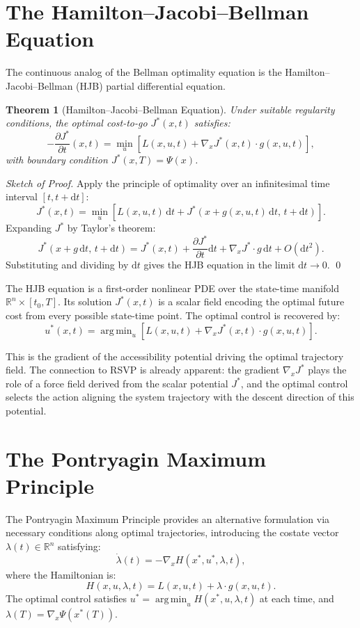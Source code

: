 \documentclass[12pt, a4paper, openany]{book}
\theoremstyle{plain}
\newtheorem{theorem}{Theorem}[chapter]
\theoremstyle{definition}
\theoremstyle{remark}
\newcommand{\argmin}{\operatorname{arg\,min}}
\begin{document}
\section{The Hamilton--Jacobi--Bellman Equation}

The continuous analog of the Bellman optimality equation is the Hamilton--Jacobi--Bellman (HJB) partial differential equation.

\begin{theorem}[Hamilton--Jacobi--Bellman Equation]
Under suitable regularity conditions, the optimal cost-to-go $J^*(x,t)$ satisfies:
\[
-\frac{\partial J^*}{\partial t}(x,t) = \min_u\left[L(x,u,t) + \nabla_x J^*(x,t) \cdot g(x,u,t)\right],
\]
with boundary condition $J^*(x,T) = \Psi(x)$.
\end{theorem}

\begin{proof}[Sketch of Proof]
Apply the principle of optimality over an infinitesimal time interval $[t, t+\mathrm{d}t]$:
\[
J^*(x,t) = \min_u\left[L(x,u,t)\,\mathrm{d}t + J^*(x + g(x,u,t)\,\mathrm{d}t,\, t+\mathrm{d}t)\right].
\]
Expanding $J^*$ by Taylor's theorem:
\[
J^*(x + g\,\mathrm{d}t,\, t+\mathrm{d}t) = J^*(x,t) + \frac{\partial J^*}{\partial t}\mathrm{d}t + \nabla_x J^* \cdot g\,\mathrm{d}t + O(\mathrm{d}t^2).
\]
Substituting and dividing by $\mathrm{d}t$ gives the HJB equation in the limit $\mathrm{d}t \to 0$. \qed
\end{proof}

The HJB equation is a first-order nonlinear PDE over the state-time manifold $\mathbb{R}^n \times [t_0, T]$. Its solution $J^*(x,t)$ is a scalar field encoding the optimal future cost from every possible state-time point. The optimal control is recovered by:
\[
u^*(x,t) = \argmin_u\left[L(x,u,t) + \nabla_x J^*(x,t) \cdot g(x,u,t)\right].
\]

This is the gradient of the accessibility potential driving the optimal trajectory field. The connection to RSVP is already apparent: the gradient $\nabla_x J^*$ plays the role of a force field derived from the scalar potential $J^*$, and the optimal control selects the action aligning the system trajectory with the descent direction of this potential.

\section{The Pontryagin Maximum Principle}

The Pontryagin Maximum Principle provides an alternative formulation via necessary conditions along optimal trajectories, introducing the costate vector $\lambda(t) \in \mathbb{R}^n$ satisfying:
\[
\dot{\lambda}(t) = -\nabla_x H(x^*, u^*, \lambda, t),
\]
where the Hamiltonian is:
\[
H(x,u,\lambda,t) = L(x,u,t) + \lambda \cdot g(x,u,t).
\]
The optimal control satisfies $u^* = \argmin_u H(x^*, u, \lambda, t)$ at each time, and $\lambda(T) = \nabla_x \Psi(x^*(T))$.
\end{document}
